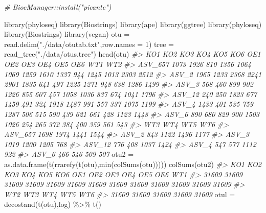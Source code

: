 \documentclass[
]{article}
\newenvironment{Shaded}{\begin{snugshade}}{\end{snugshade}}
\newcommand{\AttributeTok}[1]{\textcolor[rgb]{0.77,0.63,0.00}{#1}}
\newcommand{\CommentTok}[1]{\textcolor[rgb]{0.56,0.35,0.01}{\textit{#1}}}
\newcommand{\DecValTok}[1]{\textcolor[rgb]{0.00,0.00,0.81}{#1}}
\newcommand{\FunctionTok}[1]{\textcolor[rgb]{0.00,0.00,0.00}{#1}}
\newcommand{\NormalTok}[1]{#1}
\newcommand{\OtherTok}[1]{\textcolor[rgb]{0.56,0.35,0.01}{#1}}
\newcommand{\SpecialCharTok}[1]{\textcolor[rgb]{0.00,0.00,0.00}{#1}}
\newcommand{\StringTok}[1]{\textcolor[rgb]{0.31,0.60,0.02}{#1}}
\begin{document}
\begin{Shaded}
\begin{Highlighting}[]
\CommentTok{\# BiocManager::install("picante")}

\FunctionTok{library}\NormalTok{(phyloseq)}
\FunctionTok{library}\NormalTok{(Biostrings)}
\FunctionTok{library}\NormalTok{(ape)}
\FunctionTok{library}\NormalTok{(ggtree)}
\FunctionTok{library}\NormalTok{(phyloseq)}
\FunctionTok{library}\NormalTok{(Biostrings)}
\FunctionTok{library}\NormalTok{(vegan)}
\NormalTok{otu }\OtherTok{=} \FunctionTok{read.delim}\NormalTok{(}\StringTok{"./data/otutab.txt"}\NormalTok{,}\AttributeTok{row.names =} \DecValTok{1}\NormalTok{)}
\NormalTok{tree }\OtherTok{=} \FunctionTok{read\_tree}\NormalTok{(}\StringTok{"./data/otus.tree"}\NormalTok{)}
\FunctionTok{head}\NormalTok{(otu)}
\CommentTok{\#\textgreater{}          KO1  KO2  KO3  KO4  KO5  KO6  OE1  OE2  OE3  OE4  OE5  OE6  WT1  WT2}
\CommentTok{\#\textgreater{} ASV\_657 1073 1926  810 1356 1064 1069 1259 1610 1337  944 1245 1013 2303 2512}
\CommentTok{\#\textgreater{} ASV\_2   1965 1233 2368 2241 2901 1835  641  497 1225 1271  948  638 1286 1499}
\CommentTok{\#\textgreater{} ASV\_3    568  460  899  902 1226  855  607  457 1058 1036  837  674 1041 1796}
\CommentTok{\#\textgreater{} ASV\_12   240  250 1823  677 1459  491  324 1918 1487  991  557  337 1075 1199}
\CommentTok{\#\textgreater{} ASV\_4   1433  401  535  759 1287  506  515  590  439  621  661  428 1123 1448}
\CommentTok{\#\textgreater{} ASV\_6    890  680  829  900 1503 1026  254  265  372  384  400  359  561  543}
\CommentTok{\#\textgreater{}          WT3  WT4  WT5  WT6}
\CommentTok{\#\textgreater{} ASV\_657 1698 1974 1441 1544}
\CommentTok{\#\textgreater{} ASV\_2    843 1122 1496 1177}
\CommentTok{\#\textgreater{} ASV\_3   1019 1200 1205  768}
\CommentTok{\#\textgreater{} ASV\_12   776  408 1037 1424}
\CommentTok{\#\textgreater{} ASV\_4    547  577 1112  922}
\CommentTok{\#\textgreater{} ASV\_6    466  546  509  507}
\NormalTok{otu2 }\OtherTok{=} \FunctionTok{as.data.frame}\NormalTok{(}\FunctionTok{t}\NormalTok{(}\FunctionTok{rrarefy}\NormalTok{(}\FunctionTok{t}\NormalTok{(otu),}\FunctionTok{min}\NormalTok{(}\FunctionTok{colSums}\NormalTok{(otu)))))}
\FunctionTok{colSums}\NormalTok{(otu2)}
\CommentTok{\#\textgreater{}   KO1   KO2   KO3   KO4   KO5   KO6   OE1   OE2   OE3   OE4   OE5   OE6   WT1 }
\CommentTok{\#\textgreater{} 31609 31609 31609 31609 31609 31609 31609 31609 31609 31609 31609 31609 31609 }
\CommentTok{\#\textgreater{}   WT2   WT3   WT4   WT5   WT6 }
\CommentTok{\#\textgreater{} 31609 31609 31609 31609 31609}
\NormalTok{otul }\OtherTok{=} \FunctionTok{decostand}\NormalTok{(}\FunctionTok{t}\NormalTok{(otu),}\StringTok{\textquotesingle{}log\textquotesingle{}}\NormalTok{) }\SpecialCharTok{\%\textgreater{}\%} \FunctionTok{t}\NormalTok{()}


\end{Highlighting}
\end{Shaded}
\end{document}
